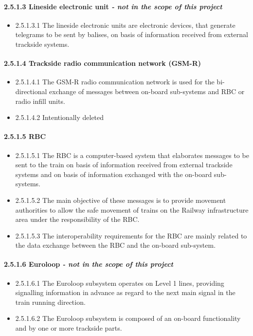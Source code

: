 \paragraph{2.5.1.3 Lineside electronic unit \textit{- not in the scope of this project}}
\begin{itemize}
\item 2.5.1.3.1	The lineside electronic units are electronic devices, that generate telegrams to be sent by balises, on basis of information received from external trackside systems.
\end{itemize}

\paragraph{2.5.1.4 Trackside radio communication network (GSM-R)}
\begin{itemize}
\item 2.5.1.4.1	The GSM-R radio communication network is used for the bi-directional exchange of messages between on-board sub-systems and RBC or radio infill units. 
\item 2.5.1.4.2	Intentionally deleted
\end{itemize}

\paragraph{2.5.1.5 RBC}
\begin{itemize}
\item 2.5.1.5.1	The RBC is a computer-based system that elaborates messages to be sent to the train on basis of information received from external trackside systems and on basis of information exchanged with the on-board sub-systems. 
\item 2.5.1.5.2	The main objective of these messages is to provide movement authorities to allow the safe movement of trains on the Railway infrastructure area under the responsibility of the RBC.
\item 2.5.1.5.3	The interoperability requirements for the RBC are mainly related to the data exchange between the RBC and the on-board sub-system.
\end{itemize}

\paragraph{2.5.1.6 Euroloop \textit{- not in the scope of this project}}
\begin{itemize}
\item 2.5.1.6.1	The Euroloop subsystem operates on Level 1 lines, providing signalling information in advance as regard to the next main signal in the train running direction.
\item 2.5.1.6.2	The Euroloop subsystem is composed of an on-board functionality and by one or more trackside parts. 
\end{itemize}
 

